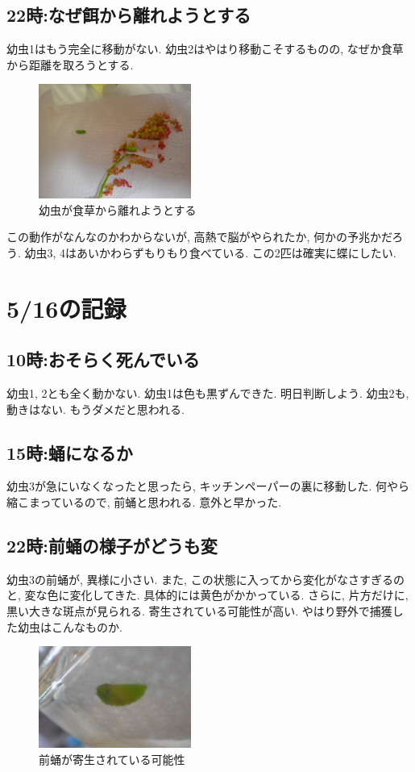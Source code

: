 \documentclass{jsarticle}
\begin{document}
\subsection{22時:なぜ餌から離れようとする}
幼虫1はもう完全に移動がない. 幼虫2はやはり移動こそするものの, なぜか食草から距離を取ろうとする. 
\begin{figure}[htbp]
  \begin{center}
    \includegraphics[width=5cm]{photo3/LarvaAwayFromFeed.JPG}
  \end{center}
  \caption{幼虫が食草から離れようとする}
  \label{pic-LarvaAwayFromFeed}
\end{figure}
この動作がなんなのかわからないが, 高熱で脳がやられたか, 何かの予兆かだろう. 
幼虫3, 4はあいかわらずもりもり食べている. この2匹は確実に蝶にしたい. 

\section{5/16の記録}
\subsection{10時:おそらく死んでいる}
幼虫1, 2とも全く動かない. 幼虫1は色も黒ずんできた. 明日判断しよう. 
幼虫2も, 動きはない. もうダメだと思われる. 

\subsection{15時:蛹になるか}
幼虫3が急にいなくなったと思ったら, キッチンペーパーの裏に移動した. 
何やら縮こまっているので, 前蛹と思われる. 意外と早かった. 

\subsection{22時:前蛹の様子がどうも変}
幼虫3の前蛹が, 異様に小さい. また, この状態に入ってから変化がなさすぎるのと, 変な色に変化してきた. 
具体的には黄色がかかっている. さらに, 片方だけに, 黒い大きな斑点が見られる. 
寄生されている可能性が高い. やはり野外で捕獲した幼虫はこんなものか. 
\begin{figure}[htbp]
  \begin{center}
    \includegraphics[width=5cm]{photo3/Larva4_prePupa.JPG}
  \end{center}
  \caption{前蛹が寄生されている可能性}
\end{figure}
\end{document}
